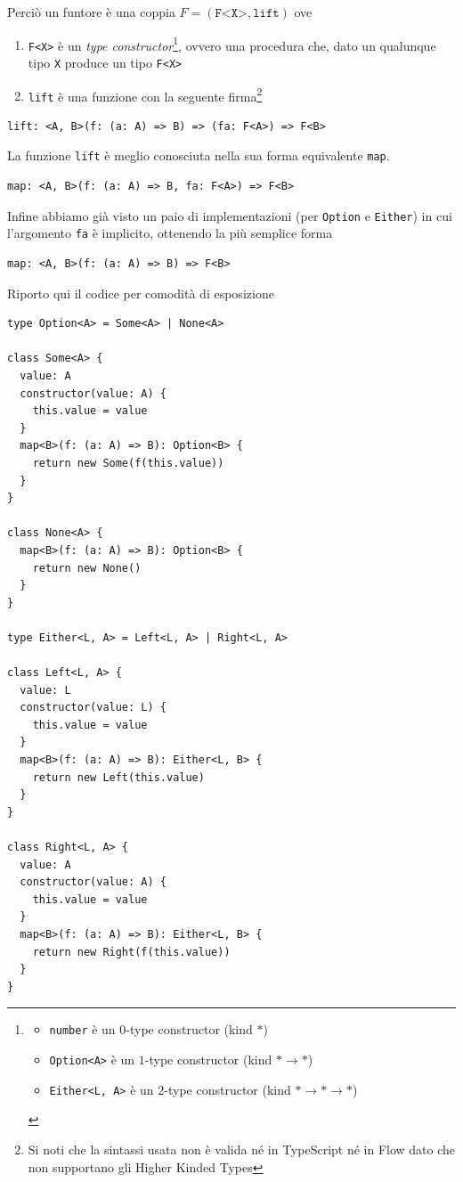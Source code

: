 \documentclass[12pt]{article}
\begin{document}
Perciò un funtore è una coppia $F = (\texttt{F<X>}, \texttt{lift})$ ove

\begin{enumerate}
  \item \texttt{F<X>} è un \emph{type constructor}\footnote{
    \begin{itemize}
      \item \texttt{number} è un $0$-type constructor (kind $*$)
      \item \texttt{Option<A>} è un $1$-type constructor (kind $* \rightarrow *$)
      \item \texttt{Either<L, A>} è un $2$-type constructor (kind $* \rightarrow * \rightarrow *$)
    \end{itemize}
  }, ovvero una procedura che, dato un qualunque tipo \texttt{X} produce un tipo \texttt{F<X>}
  \item \texttt{lift} è una funzione con la seguente firma\footnote{Si noti che la sintassi usata non è valida né in TypeScript né in Flow dato che non supportano gli Higher Kinded Types}
\end{enumerate}

\begin{verbatim}
lift: <A, B>(f: (a: A) => B) => (fa: F<A>) => F<B>
\end{verbatim}

La funzione \texttt{lift} è meglio conosciuta nella sua forma equivalente \texttt{map}.

\begin{verbatim}
map: <A, B>(f: (a: A) => B, fa: F<A>) => F<B>
\end{verbatim}

Infine abbiamo già visto un paio di implementazioni (per \texttt{Option} e \texttt{Either}) in cui l'argomento \texttt{fa} è implicito,
ottenendo la più semplice forma

\begin{verbatim}
map: <A, B>(f: (a: A) => B) => F<B>
\end{verbatim}

Riporto qui il codice per comodità di esposizione

\begin{verbatim}
type Option<A> = Some<A> | None<A>

class Some<A> {
  value: A
  constructor(value: A) {
    this.value = value
  }
  map<B>(f: (a: A) => B): Option<B> {
    return new Some(f(this.value))
  }
}

class None<A> {
  map<B>(f: (a: A) => B): Option<B> {
    return new None()
  }
}

type Either<L, A> = Left<L, A> | Right<L, A>

class Left<L, A> {
  value: L
  constructor(value: L) {
    this.value = value
  }
  map<B>(f: (a: A) => B): Either<L, B> {
    return new Left(this.value)
  }
}

class Right<L, A> {
  value: A
  constructor(value: A) {
    this.value = value
  }
  map<B>(f: (a: A) => B): Either<L, B> {
    return new Right(f(this.value))
  }
}
\end{verbatim}
\end{document}
